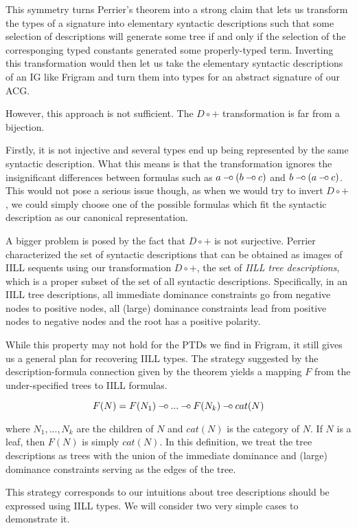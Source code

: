 This symmetry turns Perrier's theorem into a strong claim that lets us
transform the types of a signature into elementary syntactic
descriptions such that some selection of descriptions will generate some
tree if and only if the selection of the corresponging typed constants
generated some properly-typed term. Inverting this transformation would
then let us take the elementary syntactic descriptions of an IG like
Frigram and turn them into types for an abstract signature of our ACG.

However, this approach is not sufficient. The $D \circ +$ transformation
is far from a bijection.

Firstly, it is not injective and several types end up being represented
by the same syntactic description. What this means is that the
transformation ignores the insignificant differences between formulas
such as $a \mathbin{{-}\mkern-3.5mu{\circ}} (b \mathbin{{-}\mkern-3.5mu{\circ}} c)$ and $b \mathbin{{-}\mkern-3.5mu{\circ}} (a \mathbin{{-}\mkern-3.5mu{\circ}} c)$. This would not
pose a serious issue though, as when we would try to invert $D \circ +$,
we could simply choose one of the possible formulas which fit the
syntactic description as our canonical representation.

A bigger problem is posed by the fact that $D \circ +$ is not
surjective. Perrier \cite{perrier2001intuitionistic} characterized the
set of syntactic descriptions that can be obtained as images of IILL
sequents using our transformation $D \circ +$, the set of \emph{IILL
  tree descriptions}, which is a proper subset of the set of all
syntactic descriptions. Specifically, in an IILL tree descriptions, all
immediate dominance constraints go from negative nodes to positive
nodes, all (large) dominance constraints lead from positive nodes to
negative nodes and the root has a positive polarity.

While this property may not hold for the PTDs we find in Frigram, it
still gives us a general plan for recovering IILL types. The strategy
suggested by the description-formula connection given by the theorem
yields a mapping $F$ from the under-specified trees to IILL formulas.

$$
F(N) = F(N_1) \mathbin{{-}\mkern-3.5mu{\circ}} ... \mathbin{{-}\mkern-3.5mu{\circ}} F(N_k) \mathbin{{-}\mkern-3.5mu{\circ}} cat(N)
$$

where $N_1, ..., N_k$ are the children of $N$ and $cat(N)$ is the
category of $N$. If $N$ is a leaf, then $F(N)$ is simply $cat(N)$. In
this definition, we treat the tree descriptions as trees with the union
of the immediate dominance and (large) dominance constraints serving as
the edges of the tree.

This strategy corresponds to our intuitions about tree descriptions
should be expressed using IILL types. We will consider two very simple
cases to demonstrate it.

